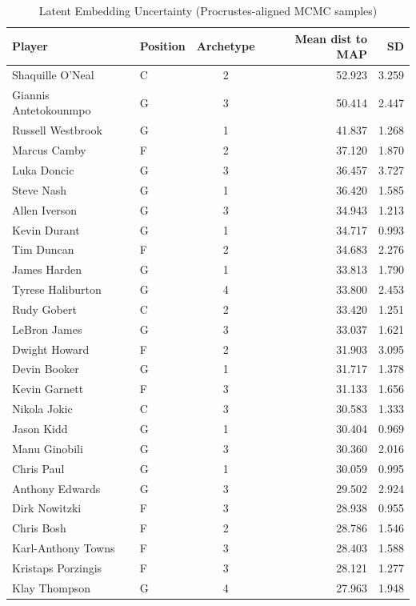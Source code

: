 \begin{table}[t]
\caption*{
{\fontsize{20}{25}\selectfont  Latent Embedding Uncertainty (Procrustes-aligned MCMC samples)\fontsize{12}{15}\selectfont }
} 
\fontsize{12.0pt}{14.0pt}\selectfont
\begin{tabular*}{\linewidth}{@{\extracolsep{\fill}}llcrr}
\toprule
Player & Position & Archetype & Mean dist to MAP & SD \\ 
\midrule\addlinespace[2.5pt]
Shaquille O'Neal & C & 2 & 52.923 & 3.259 \\ 
Giannis Antetokounmpo & G & 3 & 50.414 & 2.447 \\ 
Russell Westbrook & G & 1 & 41.837 & 1.268 \\ 
Marcus Camby & F & 2 & 37.120 & 1.870 \\ 
Luka Doncic & G & 3 & 36.457 & 3.727 \\ 
Steve Nash & G & 1 & 36.420 & 1.585 \\ 
Allen Iverson & G & 3 & 34.943 & 1.213 \\ 
Kevin Durant & G & 1 & 34.717 & 0.993 \\ 
Tim Duncan & F & 2 & 34.683 & 2.276 \\ 
James Harden & G & 1 & 33.813 & 1.790 \\ 
Tyrese Haliburton & G & 4 & 33.800 & 2.453 \\ 
Rudy Gobert & C & 2 & 33.420 & 1.251 \\ 
LeBron James & G & 3 & 33.037 & 1.621 \\ 
Dwight Howard & F & 2 & 31.903 & 3.095 \\ 
Devin Booker & G & 1 & 31.717 & 1.378 \\ 
Kevin Garnett & F & 3 & 31.133 & 1.656 \\ 
Nikola Jokic & C & 3 & 30.583 & 1.333 \\ 
Jason Kidd & G & 1 & 30.404 & 0.969 \\ 
Manu Ginobili & G & 3 & 30.360 & 2.016 \\ 
Chris Paul & G & 1 & 30.059 & 0.995 \\ 
Anthony Edwards & G & 3 & 29.502 & 2.924 \\ 
Dirk Nowitzki & F & 3 & 28.938 & 0.955 \\ 
Chris Bosh & F & 2 & 28.786 & 1.546 \\ 
Karl-Anthony Towns & F & 3 & 28.403 & 1.588 \\ 
Kristaps Porzingis & F & 3 & 28.121 & 1.277 \\ 
Klay Thompson & G & 4 & 27.963 & 1.948 \\ 

\end{tabular*}
\end{table}
